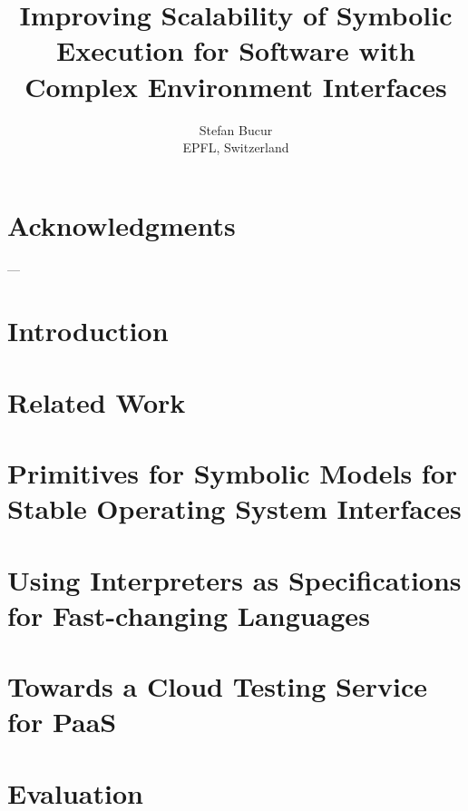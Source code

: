 \documentclass[letterpaper,10pt,oneside]{book}
\newcommand{\thesistitle}{Improving Scalability of Symbolic Execution for Software with Complex Environment Interfaces}
\begin{document}
\title{\thesistitle}
\author{Stefan Bucur \\ EPFL, Switzerland}

\maketitle




\chapter*{Acknowledgments}

---

\tableofcontents
\listoffigures
\listoftables

\chapter{Introduction}
\label{ch:introduction}


\chapter{Related Work}
\label{ch:relatedwork}


\chapter{Primitives for Symbolic Models for Stable Operating System Interfaces}
\label{ch:cloud9}


\chapter{Using Interpreters as Specifications for Fast-changing Languages}
\label{ch:chef}


\chapter{Towards a Cloud Testing Service for PaaS}
\label{ch:paas}


\chapter{Evaluation}
\label{ch:evaluation}

\end{document}
